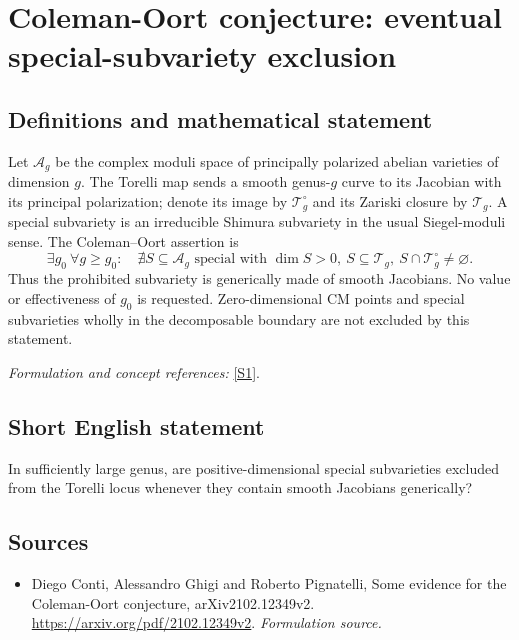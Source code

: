 \documentclass[11pt]{article}
\begin{document}
\section*{\texorpdfstring{Coleman-Oort conjecture: eventual special-subvariety exclusion}{Coleman-Oort conjecture: eventual special-subvariety exclusion}}\label{30006909}
\subsection{Definitions and mathematical statement}
Let $\mathcal A_g$ be the complex moduli space of principally polarized abelian varieties of dimension $g$. The Torelli map sends a smooth genus-$g$ curve to its Jacobian with its principal polarization; denote its image by $\mathcal T_g^\circ$ and its Zariski closure by $\mathcal T_g$. A special subvariety is an irreducible Shimura subvariety in the usual Siegel-moduli sense. The Coleman--Oort assertion is
\[
 \exists g_0\ \forall g\ge g_0:\quad
 \nexists S\subseteq\mathcal A_g\text{ special with }
 \dim S>0,\ S\subseteq\mathcal T_g,\ S\cap\mathcal T_g^\circ\ne\varnothing.
\]
Thus the prohibited subvariety is generically made of smooth Jacobians. No value or effectiveness of $g_0$ is requested. Zero-dimensional CM points and special subvarieties wholly in the decomposable boundary are not excluded by this statement.
\par\smallskip\textit{Formulation and concept references:} \href{https://arxiv.org/pdf/2102.12349v2}{[S1]}.

\subsection{Short English statement}
In sufficiently large genus, are positive-dimensional special subvarieties excluded from the Torelli locus whenever they contain smooth Jacobians generically?
\subsection{Sources}
\begin{itemize}
\item[S1]Diego Conti, Alessandro Ghigi and Roberto Pignatelli, Some evidence for the Coleman-Oort conjecture, arXiv2102.12349v2.
\url{https://arxiv.org/pdf/2102.12349v2}.
\textit{Formulation source.}
\end{itemize}
\end{document}
